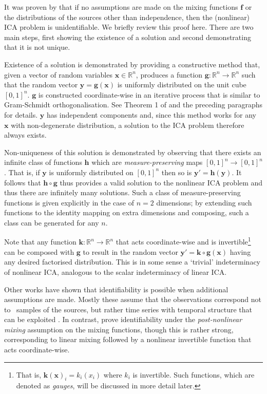 It was proven by \cite{hyvarinen1999nonlinear} that if no assumptions are made on the mixing functions $\bm{f}$ or the distributions of the sources other than independence, then the (nonlinear) ICA problem is unidentifiable.
We briefly review this proof here. 
There are two main steps, first showing the existence of a solution and second demonstrating that it is not unique.

Existence of a solution is demonstrated by providing a constructive method that, given a vector of random variables $\bm{x} \in \mathbb{R}^n$, produces a function $\bm{g}: \mathbb{R}^n \to \mathbb{R}^n$ such that the random vector $\bm{y} = \bm{g}(\bm{x}) $ is uniformly distributed on the unit cube $[0, 1]^n$.
$\bm{g}$ is constructed coordinate-wise in an iterative process that is similar to Gram-Schmidt orthogonalisation. See Theorem 1 of \cite{hyvarinen1999nonlinear} and the preceding paragraphs for details.
$\bm{y}$ has independent components and, since this method works for any $\bm{x}$ with non-degenerate distribution, a solution to the ICA problem therefore always exists.

Non-uniqueness of this solution is demonstrated by observing that there exists an infinite class of functions $\bm{h}$ which are \emph{measure-preserving} maps $[0,1]^n \to [0,1]^n$. 
That is, if $\bm{y}$ is uniformly distributed on $[0,1]^n$ then so is  $\bm{y}' = \bm{h}(\bm{y})$.
It follows that $\bm{h}\circ \bm{g}$ thus provides a valid solution to the nonlinear ICA problem and thus there are infinitely many solutions. 
Such a class of measure-preserving functions is given explicitly in the case of $n=2$ dimensions; by extending such functions to the identity mapping on extra dimensions and composing, such a class can be generated for any $n$.

Note that any function $\bm{k}: \mathbb{R}^n \to \mathbb{R}^n$ that acts coordinate-wise and is invertible\footnote{That is, $\bm{k}(\bm{x})_i = k_i(x_i)$ where $k_i$ is invertible. Such functions, which are denoted as \emph{gauges}, will be discussed in more detail later.} can be composed with $\bm{g}$ to result in the random vector $\bm{y}' = \bm{k}\circ \bm{g}(\bm{x})$ having any desired factorised distribution. 
This is in some sense a `trivial' indeterminacy of nonlinear ICA, analogous to the scalar indeterminacy of linear ICA.

Other works have shown that identifiability is possible when additional assumptions are made.
Mostly these assume that the observations correspond not to \iid~samples of the sources, but rather time series with temporal structure that can be exploited \citep{cardoso2001three, singer2008non, sprekeler2014extension}.
In contrast, \cite{taleb1999source} prove identifiability under the \emph{post-nonlinear mixing} assumption on the mixing functions, though this is rather strong, corresponding to linear mixing followed by a nonlinear invertible function that acts coordinate-wise.


